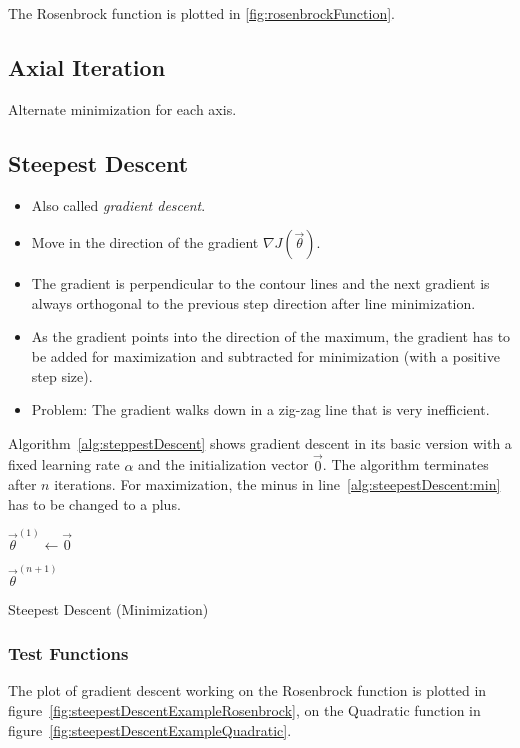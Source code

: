 				The Rosenbrock function is plotted in \ref{fig:rosenbrockFunction}.

		\subsection{Axial Iteration}
			Alternate minimization for each axis.

		\subsection{Steepest Descent}
			\begin{itemize}
				\item Also called \emph{gradient descent}.
				\item Move in the direction of the gradient \( \nabla J(\vec{\theta}) \).
				\item The gradient is perpendicular to the contour lines and the next gradient is always orthogonal to the previous step direction after line minimization.
				\item As the gradient points into the direction of the maximum, the gradient has to be added for maximization and subtracted for minimization (with a positive step size).
				\item Problem: The gradient walks down in a zig-zag line that is very inefficient.
			\end{itemize}

			Algorithm~\ref{alg:steppestDescent} shows gradient descent in its basic version with a fixed learning rate \(\alpha\) and the initialization vector \(\vec{0}\). The algorithm terminates after \(n\) iterations. For maximization, the minus in line~\ref{alg:steepestDescent:min} has to be changed to a plus.

			\begin{algorithm}
				\(\vec{\theta}^{(1)} \gets \vec{0} \)


				\Return \(\vec{\theta}^{(n + 1)}\)

				\caption{Steepest Descent (Minimization)}
				\label{alg:steppestDescent}
			\end{algorithm}

			\subsubsection{Test Functions}
				The plot of gradient descent working on the Rosenbrock function is plotted in figure~\ref{fig:steepestDescentExampleRosenbrock}, on the Quadratic function in figure~\ref{fig:steepestDescentExampleQuadratic}.

